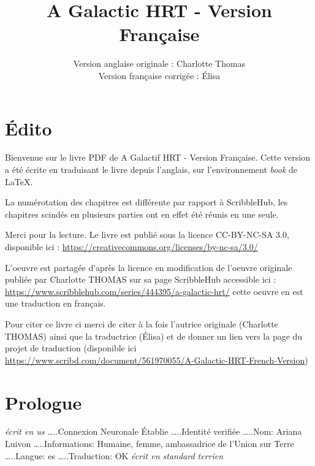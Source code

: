 \documentclass[12pt,hidelinks,a4paper]{book}
\title{A Galactic HRT - Version Française}
\author{Version anglaise originale : Charlotte Thomas \\ Version française corrigée : Élisa}
\begin{document}
\maketitle 
\tableofcontents

\chapter*{Édito}

Bienvenue sur le livre PDF de A Galactif HRT - Version Française. Cette version a été
écrite en traduisant le livre depuis l'anglais, sur l'environnement
\textit{book} de \LaTeX .

\bigskip
La numérotation des chapitres est différente par rapport à ScribbleHub,
les chapitres scindés en plusieurs parties ont en effet été réunis
en une seule.

\bigskip
Merci pour la lecture. Le livre est publié sous la licence CC-BY-NC-SA
3.0, disponible ici : \url{https://creativecommons.org/licenses/by-nc-sa/3.0/}

L'oeuvre est partagée d'après la licence en modification de l'oeuvre originale publiée par 
Charlotte THOMAS sur sa page ScribbleHub accessible ici : \url{https://www.scribblehub.com/series/444395/a-galactic-hrt/} cette 
oeuvre en est une traduction en français. \par
\bigskip

Pour citer ce livre ci merci de citer à la fois l'autrice originale (Charlotte THOMAS) ainsi que 
la traductrice (Élisa) et de donner un lien vers la page du projet de traduction (disponible ici \url{https://www.scribd.com/document/561970055/A-Galactic-HRT-French-Version})


\chapter*{Prologue}

\textit{écrit en \gls{us}}\newline
…..Connexion Neuronale Établie\newline
…..Identité verifiée\newline
…..Nom: Ariana Luivon\newline
…..Informations: Humaine, femme, ambassadrice de l'Union sur Terre\newline
…..Langue: \gls{es}\newline
…..Traduction: OK\newline
\textit{écrit en standard terrien}\par
\bigskip
\end{document}
